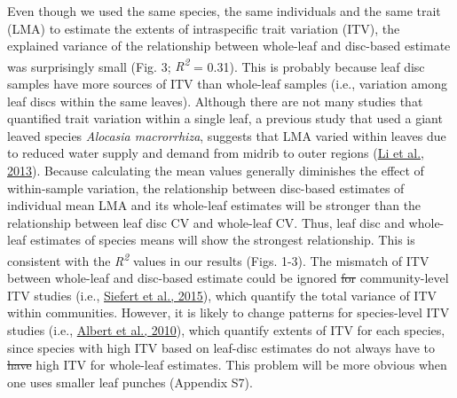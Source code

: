 \documentclass[
  12pt,
  a4paper,
,tablecaptionabove
]{scrartcl}
\providecommand{\DIFaddtex}[1]{{\protect\color{blue}\uwave{#1}}} %
\providecommand{\DIFdeltex}[1]{{\protect\color{red}\sout{#1}}}                      %
\providecommand{\DIFaddbegin}{} %
\providecommand{\DIFaddend}{} %
\providecommand{\DIFdelbegin}{} %
\providecommand{\DIFdelend}{} %
\providecommand{\DIFadd}[1]{\texorpdfstring{\DIFaddtex{#1}}{#1}} %
\providecommand{\DIFdel}[1]{\texorpdfstring{\DIFdeltex{#1}}{}} %
\newcommand{\DIFscaledelfig}{0.5}
\newlength{\DIFdelgraphicswidth} %
\newlength{\DIFdelgraphicsheight} %
\newcommand{\DIFaddincludegraphics}[2][]{{\color{blue}\fbox{\DIFOincludegraphics[#1]{#2}}}} %
\newcommand{\DIFdelincludegraphics}[2][]{%
\sbox{\DIFdelgraphicsbox}{\DIFOincludegraphics[#1]{#2}}%
\settoboxwidth{\DIFdelgraphicswidth}{\DIFdelgraphicsbox} %
\settoboxtotalheight{\DIFdelgraphicsheight}{\DIFdelgraphicsbox} %
\scalebox{\DIFscaledelfig}{%
\parbox[b]{\DIFdelgraphicswidth}{\usebox{\DIFdelgraphicsbox}\\[-\baselineskip] \rule{\DIFdelgraphicswidth}{0em}}\llap{\resizebox{\DIFdelgraphicswidth}{\DIFdelgraphicsheight}{%
\setlength{\unitlength}{\DIFdelgraphicswidth}%
\begin{picture}(1,1)%
\thicklines\linethickness{2pt} %
{\color[rgb]{1,0,0}\put(0,0){\framebox(1,1){}}}%
{\color[rgb]{1,0,0}\put(0,0){\line( 1,1){1}}}%
{\color[rgb]{1,0,0}\put(0,1){\line(1,-1){1}}}%
\end{picture}%
}\hspace*{3pt}}} %
} %
\DeclareRobustCommand{\DIFaddbegin}{\DIFOaddbegin \let\includegraphics\DIFaddincludegraphics} %
\DeclareRobustCommand{\DIFaddend}{\DIFOaddend \let\includegraphics\DIFOincludegraphics} %
\DeclareRobustCommand{\DIFdelbegin}{\DIFOdelbegin \let\includegraphics\DIFdelincludegraphics} %
\DeclareRobustCommand{\DIFdelend}{\DIFOaddend \let\includegraphics\DIFOincludegraphics} %
\begin{document}
Even though we used the same species, the same individuals and the same
trait (LMA) to estimate the extents of intraspecific trait variation
(ITV), the explained variance of the relationship between whole-leaf and
disc-based estimate was surprisingly small (Fig. 3;
\emph{R\textsuperscript{2}} = 0.31). This is probably because leaf disc
samples have more sources of ITV than whole-leaf samples (i.e.,
variation among leaf discs within the same leaves). Although there are
not many studies that quantified trait variation within a single leaf, a
previous study that used a giant leaved species \emph{Alocasia
macrorrhiza}, suggests that LMA varied within leaves due to reduced
water supply and demand from midrib to outer regions
(\protect\hyperlink{ref-Li2013a}{Li et al., 2013}). Because calculating
the mean values generally diminishes the effect of within-sample
variation, the relationship between disc-based estimates of individual
mean LMA and its whole-leaf estimates will be stronger than the
relationship between leaf disc CV and whole-leaf CV. Thus, leaf disc and
whole-leaf estimates of species means will show the strongest
relationship. This is consistent with the \emph{R\textsuperscript{2}}
values in our results (Figs. 1-3). The mismatch of ITV between
whole-leaf and disc-based estimate could be ignored \DIFdelbegin \DIFdel{for }\DIFdelend \DIFaddbegin \DIFadd{in }\DIFaddend community-level
ITV studies (i.e., \protect\hyperlink{ref-Siefert2015}{Siefert et al.,
2015}), which quantify the total variance of ITV within communities.
However, it is likely to change patterns for species-level ITV studies
(i.e., \protect\hyperlink{ref-Albert2010a}{Albert et al., 2010}), which
quantify extents of ITV for each species, since species with high ITV
based on leaf-disc estimates do not always have to \DIFdelbegin \DIFdel{have }\DIFdelend \DIFaddbegin \DIFadd{show }\DIFaddend high ITV for
whole-leaf estimates. This problem will be more obvious when one uses
smaller leaf punches (Appendix S7).
\end{document}
